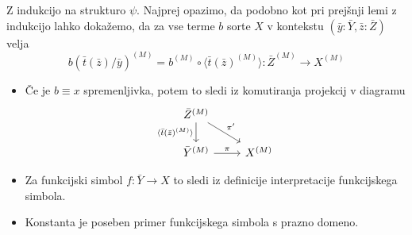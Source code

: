 \documentclass[../kategoricna_logika.tex]{subfiles}
\begin{document}
\begin{dokaz}
  Z indukcijo na strukturo $\psi$.  Najprej opazimo, da podobno kot
  pri prejšnji lemi z indukcijo lahko dokažemo, da za vse terme $b$
  sorte $X$ v kontekstu $(\bar{y}:\bar{Y}, \bar{z}:\bar{Z})$ velja
  $$b(\bar{t}(\bar{z})/\bar{y})^{(M)} = b^{(M)}  \circ \langle \bar{t}(\bar{z})^{(M)} \rangle : \bar{Z}^{(M)} \to X^{(M)} $$
  \begin{itemize}
  \item Če je $b \equiv x$ spremenljivka, potem to sledi iz
    komutiranja projekcij v diagramu
    \begin{equation*}
      \begin{tikzcd}
        \bar{Z}^{(M)} \ar[d, "\langle \bar{t}(\bar{z})^{(M)} \rangle"'] \ar[dr, "\pi'"] & \\
        \bar{Y}^{(M)} \ar[r, "\pi"] & X^{(M)}
      \end{tikzcd}
    \end{equation*}
    
  \item Za funkcijski simbol $f : \bar{Y} \to X$ to sledi iz definicije interpretacije funkcijskega simbola.

  \item Konstanta je poseben primer funkcijskega simbola s prazno domeno.
  \end{itemize}


\end{dokaz}
\end{document}
